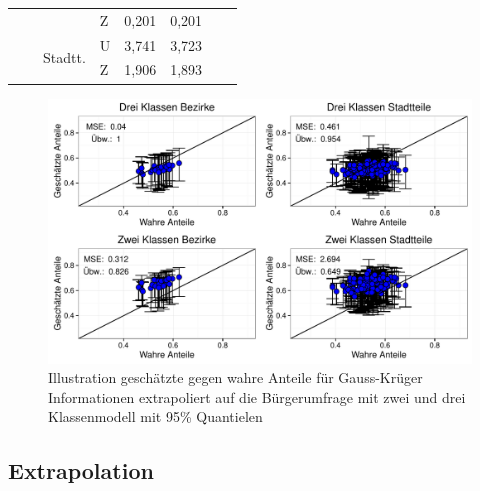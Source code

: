 \documentclass{Vorlage}
\begin{document}
\begin{table}[h]
\begin{tabular}{llll|cc|cc}
                        &                               &                          & Z & 0,201       & 0,201      &                   &                 \\ \cline{3-8} 
                        &                               & \multirow{2}{*}{Stadtt.} & U & 3,741        & 3,723      &                   &                 \\
                        &                               &                          & Z & 1,906        & 1,893     &                   &                                        
                         \\ \hline \hline
\end{tabular}
\end{table}

\begin{figure}[h]
 \begin{center}
 \includegraphics[scale=0.8]{Pictures/PaT}
 \caption{Illustration geschätzte gegen wahre Anteile für Gauss-Krüger Informationen extrapoliert auf die Bürgerumfrage mit zwei und drei Klassenmodell mit 95\% Quantielen}
 \label{vali4}
 \end{center}
\end{figure}

\subsection{Extrapolation}
\end{document}
